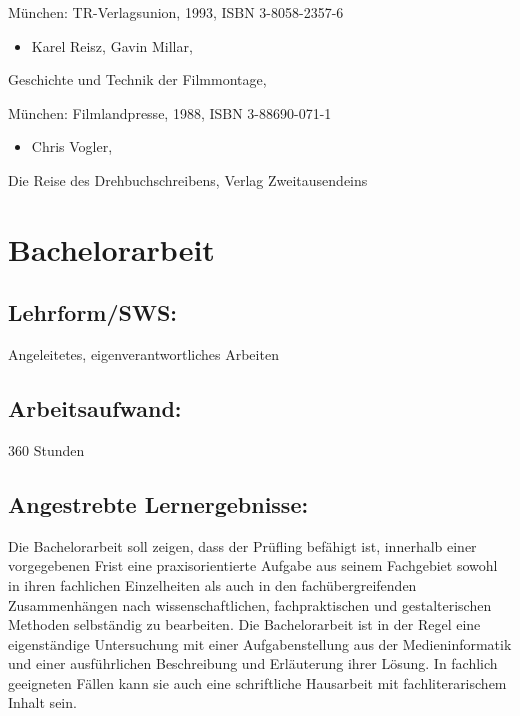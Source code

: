 München: TR-Verlagsunion, 1993, ISBN 3-8058-2357-6

\begin{itemize}
\tightlist
\item
  Karel Reisz, Gavin Millar,
\end{itemize}

Geschichte und Technik der Filmmontage,

München: Filmlandpresse, 1988, ISBN 3-88690-071-1

\begin{itemize}
\tightlist
\item
  Chris Vogler,
\end{itemize}

Die Reise des Drehbuchschreibens, Verlag Zweitausendeins

\chapter{Bachelorarbeit}\label{bachelorarbeit}

\section*{Lehrform/SWS:}\label{lehrformsws-1}

Angeleitetes, eigenverantwortliches Arbeiten

\section*{Arbeitsaufwand:}\label{arbeitsaufwand-1}

360 Stunden

\section*{Angestrebte
Lernergebnisse:}\label{angestrebte-lernergebnisse-3}

Die Bachelorarbeit soll zeigen, dass der Prüfling befähigt ist,
innerhalb einer vorgegebenen Frist eine praxisorientierte Aufgabe aus
seinem Fachgebiet sowohl in ihren fachlichen Einzelheiten als auch in
den fachübergreifenden Zusammenhängen nach wissenschaftlichen,
fachpraktischen und gestalterischen Methoden selbständig zu bearbeiten.
Die Bachelorarbeit ist in der Regel eine eigenständige Untersuchung mit
einer Aufgabenstellung aus der Medieninformatik und einer ausführlichen
Beschreibung und Erläuterung ihrer Lösung. In fachlich geeigneten Fällen
kann sie auch eine schriftliche Hausarbeit mit fachliterarischem Inhalt
sein.


